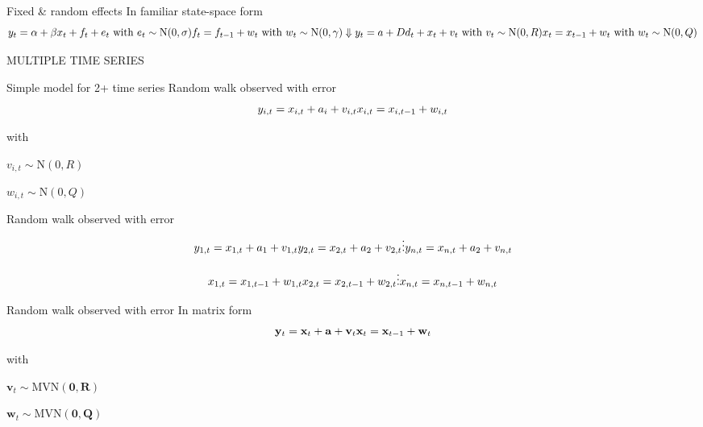 \documentclass[
  ignorenonframetext,
]{beamer}
\begin{document}
\begin{frame}{Fixed \& random effects \textbar{} In familiar state-space
form}
\protect\hypertarget{fixed-random-effects-in-familiar-state-space-form}{}
\[
y_t = \alpha + \beta x_t + f_t + e_t ~ \text{with} ~ e_t \sim \text{N}(0, \sigma) \\
f_t = f_{t-1} + w_t ~ \text{with} ~ w_t \sim \text{N}(0, \gamma) \\
\Downarrow \\
y_t = a + D d_t + x_t + v_t ~ \text{with} ~ v_t \sim \text{N}(0, R) \\
x_t = x_{t-1} + w_t ~ \text{with} ~ w_t \sim \text{N}(0, Q)
\]
\end{frame}

\begin{frame}{}
\protect\hypertarget{section-1}{}
MULTIPLE TIME SERIES
\end{frame}

\begin{frame}{Simple model for 2+ time series \textbar{} Random walk
observed with error}
\protect\hypertarget{simple-model-for-2-time-series-random-walk-observed-with-error}{}
\[
y_{i,t} = x_{i,t} + a_i + v_{i,t} \\
x_{i,t} = x_{i,t-1} + w_{i,t}
\]

with

\(v_{i,t} \sim \text{N}(0, R)\)

\(w_{i,t} \sim \text{N}(0, Q)\)
\end{frame}

\begin{frame}{Random walk observed with error}
\protect\hypertarget{random-walk-observed-with-error-1}{}
\[
y_{1,t} = x_{1,t} + a_1 + v_{1,t} \\
y_{2,t} = x_{2,t} + a_2 + v_{2,t} \\
\vdots \\
y_{n,t} = x_{n,t} + a_2 + v_{n,t} \\
\]

\[
x_{1,t} = x_{1,t-1} + w_{1,t} \\
x_{2,t} = x_{2,t-1} + w_{2,t} \\
\vdots \\
x_{n,t} = x_{n,t-1} + w_{n,t}
\]
\end{frame}

\begin{frame}{Random walk observed with error \textbar{} In matrix form}
\protect\hypertarget{random-walk-observed-with-error-in-matrix-form}{}
\[
\mathbf{y}_t = \mathbf{x}_t + \mathbf{a} + \mathbf{v}_t \\
\mathbf{x}_t = \mathbf{x}_{t-1} + \mathbf{w}_t
\]

with

\(\mathbf{v}_t \sim \text{MVN}(\mathbf{0}, \mathbf{R})\)

\(\mathbf{w}_t \sim \text{MVN}(\mathbf{0}, \mathbf{Q})\)
\end{frame}
\end{document}
